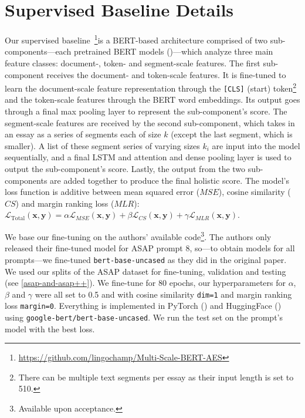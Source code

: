 \section{Supervised Baseline Details}
\label{supervised-baseline-details}
Our supervised baseline~\cite{wang-etal-2022-use}\footnote{\url{https://github.com/lingochamp/Multi-Scale-BERT-AES}}is a BERT-based architecture comprised of two sub-components---each pretrained BERT models (\cite{devlin})---which analyze three main feature classes: document-, token- and segment-scale features. The first sub-component receives the document- and token-scale features. It is fine-tuned to learn the document-scale feature representation through the \texttt{[CLS]} (start) token\footnote{There can be multiple text segments per essay as their input length is set to 510.} and the token-scale features through the BERT word embeddings. Its output goes through a final max pooling layer to represent the sub-component's score. The segment-scale features are received by the second sub-component, which takes in an essay as a series of segments each of size $k$ (except the last segment, which is smaller). A list of these segment series of varying sizes $k_{i}$ are input into the model sequentially, and a final LSTM and attention and dense pooling layer is used to output the sub-component's score. Lastly, the output from the two sub-components are added together to produce the final holistic score. The model's loss function is additive between mean squared error ($MSE$), cosine similarity ($CS$) and margin ranking loss ($MLR$): $\mathcal{L}_{\mathrm{Total}}(\mathbf{x}, \mathbf{y}) = \alpha \mathcal{L}_{MSE}(\mathbf{x}, \mathbf{y}) + \beta \mathcal{L}_{CS}(\mathbf{x}, \mathbf{y}) + \gamma \mathcal{L}_{MLR}(\mathbf{x}, \mathbf{y})$.

We base our fine-tuning on the authors' available code\footnote{Available upon acceptance.}. The authors only released their fine-tuned model for ASAP prompt 8, so---to obtain models for all prompts---we fine-tuned \texttt{bert-base-uncased} as they did in the original paper. We used our splits of the ASAP dataset for fine-tuning, validation and testing (see \ref{asap-and-asap++}). We fine-tune for 80 epochs, our hyperparameters for $\alpha$, $\beta$ and $\gamma$ were all set to 0.5 and with cosine similarity \texttt{dim=1} and margin ranking loss \texttt{margin=0}. Everything is implemented in PyTorch (\cite{paszke2019}) and HuggingFace (\cite{wolf2019}) using \texttt{google-bert/bert-base-uncased}. We run the test set on the prompt's model with the best loss.
